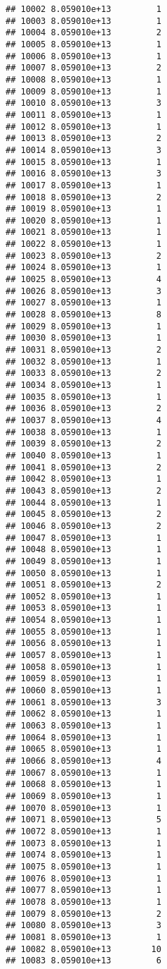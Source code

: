 \documentclass[
]{article}
\begin{document}
\begin{verbatim}
## 10002 8.059010e+13         1
## 10003 8.059010e+13         1
## 10004 8.059010e+13         2
## 10005 8.059010e+13         1
## 10006 8.059010e+13         1
## 10007 8.059010e+13         2
## 10008 8.059010e+13         1
## 10009 8.059010e+13         1
## 10010 8.059010e+13         3
## 10011 8.059010e+13         1
## 10012 8.059010e+13         1
## 10013 8.059010e+13         2
## 10014 8.059010e+13         3
## 10015 8.059010e+13         1
## 10016 8.059010e+13         3
## 10017 8.059010e+13         1
## 10018 8.059010e+13         2
## 10019 8.059010e+13         1
## 10020 8.059010e+13         1
## 10021 8.059010e+13         1
## 10022 8.059010e+13         1
## 10023 8.059010e+13         2
## 10024 8.059010e+13         1
## 10025 8.059010e+13         4
## 10026 8.059010e+13         3
## 10027 8.059010e+13         1
## 10028 8.059010e+13         8
## 10029 8.059010e+13         1
## 10030 8.059010e+13         1
## 10031 8.059010e+13         2
## 10032 8.059010e+13         1
## 10033 8.059010e+13         2
## 10034 8.059010e+13         1
## 10035 8.059010e+13         1
## 10036 8.059010e+13         2
## 10037 8.059010e+13         4
## 10038 8.059010e+13         1
## 10039 8.059010e+13         2
## 10040 8.059010e+13         1
## 10041 8.059010e+13         2
## 10042 8.059010e+13         1
## 10043 8.059010e+13         2
## 10044 8.059010e+13         1
## 10045 8.059010e+13         2
## 10046 8.059010e+13         2
## 10047 8.059010e+13         1
## 10048 8.059010e+13         1
## 10049 8.059010e+13         1
## 10050 8.059010e+13         1
## 10051 8.059010e+13         2
## 10052 8.059010e+13         1
## 10053 8.059010e+13         1
## 10054 8.059010e+13         1
## 10055 8.059010e+13         1
## 10056 8.059010e+13         1
## 10057 8.059010e+13         1
## 10058 8.059010e+13         1
## 10059 8.059010e+13         1
## 10060 8.059010e+13         1
## 10061 8.059010e+13         3
## 10062 8.059010e+13         1
## 10063 8.059010e+13         1
## 10064 8.059010e+13         1
## 10065 8.059010e+13         1
## 10066 8.059010e+13         4
## 10067 8.059010e+13         1
## 10068 8.059010e+13         1
## 10069 8.059010e+13         1
## 10070 8.059010e+13         1
## 10071 8.059010e+13         5
## 10072 8.059010e+13         1
## 10073 8.059010e+13         1
## 10074 8.059010e+13         1
## 10075 8.059010e+13         1
## 10076 8.059010e+13         1
## 10077 8.059010e+13         1
## 10078 8.059010e+13         1
## 10079 8.059010e+13         2
## 10080 8.059010e+13         3
## 10081 8.059010e+13         1
## 10082 8.059010e+13        10
## 10083 8.059010e+13         6

\end{verbatim}
\end{document}
